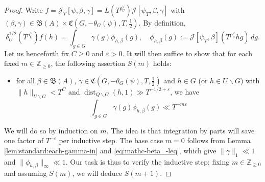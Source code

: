 \documentclass[reqno]{amsart}
\def\eps{\varepsilon}
\DeclareMathOperator{\dist}{dist}
\theoremstyle{plain} \newtheorem{theorem} {Theorem}
\theoremstyle{definition} \newtheorem{definition} [theorem] {Definition}
\theoremstyle{itplain} %
\numberwithin{equation}{section}
\numberwithin{theorem}{section}
\renewcommand{\geq}{\geqslant}
\begin{document}
\begin{proof}
  Write $f = \mathcal{J}_T[\psi,\beta,\gamma] = L(T^{\rho_U^\vee}) \mathcal{J}[\psi_T, \beta, \gamma]$ with $(\beta,\gamma) \in \mathfrak{B}(A) \times  \mathfrak{C}(G,-\theta_G(\psi),T,\tfrac{1}{2})$.  By definition,
  \begin{equation*}
    \delta_U^{1/2}(T^{\rho_U^\vee})
    f(h)
    =
    \int _{g \in G}
    \gamma(g)
    \phi_{h,\beta}(g),
    \quad
    \phi_{h,\beta}(g) := 
    \mathcal{J}[\psi_T, \beta](T^{\rho_U^\vee} h g) \, d g.
  \end{equation*}
  Let us henceforth fix $C \geq 0$ and $\eps > 0$.  It will then suffice to show that for each fixed $m \in \mathbb{Z}_{\geq 0}$, the following assertion $S(m)$ holds:
  \begin{itemize}
  \item for all $\beta \in \mathfrak{B}(A)$, $\gamma \in \mathfrak{C}(G,-\theta_G(\psi),T,\tfrac{1}{2})$ and $h \in G$ (or $h \in U \backslash G$) with $\|h\|_{U \backslash G} < T^C$ and $\dist_{Q \backslash G}(h,1) \gg T^{-1/2+\eps}$, we have
    \begin{equation*}
      \int _{g \in G} \gamma(g) \phi_{h,\beta}(g) \ll T^{-m \eps}
    \end{equation*}
  \end{itemize}
  We will do so by induction on $m$.  The idea is that integration by parts will save one factor of $T^{-\eps}$ per inductive step.  The base case $m = 0$ follows from Lemma \ref{lem:standard:each-gamma-in} and \eqref{eq:mathc-beta_-leq}, which give $\|\gamma \|_1 \ll 1$ and $\|\phi_{h,\beta}\|_{\infty} \ll 1$.  Our task is thus to verify the inductive step: fixing $m \in \mathbb{Z}_{\geq 0}$ and assuming $S(m)$, we will deduce $S(m+1)$.
  

\end{proof}
\end{document}
